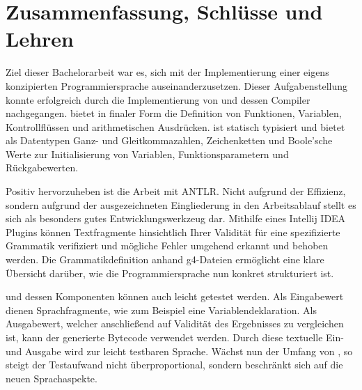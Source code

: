 \chapter{Zusammenfassung, Schlüsse und Lehren}
\label{cha:Schluss}




Ziel dieser Bachelorarbeit war es, sich mit der Implementierung einer eigens konzipierten Programmiersprache auseinanderzusetzen. Dieser Aufgabenstellung konnte erfolgreich durch die Implementierung von \toya und dessen Compiler nachgegangen. \Toya bietet in finaler Form die Definition von Funktionen, Variablen, Kontrollflüssen und arithmetischen Ausdrücken. \Toya ist statisch typisiert und bietet als Datentypen Ganz- und Gleitkommazahlen, Zeichenketten und Boole'sche Werte zur Initialisierung von Variablen, Funktionsparametern und Rückgabewerten.

Positiv hervorzuheben ist die Arbeit mit ANTLR. Nicht aufgrund der Effizienz, sondern aufgrund der ausgezeichneten Eingliederung in den Arbeitsablauf stellt es sich als besonders gutes Entwicklungswerkzeug dar. Mithilfe eines Intellij IDEA Plugins können Textfragmente hinsichtlich Ihrer Validität für eine spezifizierte Grammatik verifiziert und mögliche Fehler umgehend erkannt und behoben werden. Die Grammatikdefinition anhand g4-Dateien ermöglicht eine klare Übersicht darüber, wie die Programmiersprache nun konkret strukturiert ist.

\Toya und dessen Komponenten können auch leicht getestet werden. Als Eingabewert dienen Sprachfragmente, wie zum Beispiel eine Variablendeklaration. Als Ausgabewert, welcher anschließend auf Validität des Ergebnisses zu vergleichen ist, kann der generierte Bytecode verwendet werden. Durch diese textuelle Ein- und Ausgabe wird \toya zur leicht testbaren Sprache. Wächst nun der Umfang von \toya, so steigt der Testaufwand nicht überproportional, sondern beschränkt sich auf die neuen Sprachaspekte.

